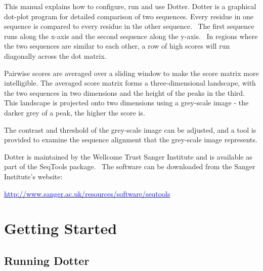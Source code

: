 \documentclass[letterpaper]{article}
\newcommand\textstyleInternetlink[1]{\textcolor{blue}{#1}}
\begin{document}
\setcounter{tocdepth}{10}
\renewcommand\contentsname{Contents}

\clearpage
\tableofcontents

{This manual explains how to configure, run and
use Dotter. Dotter is a graphical
dot-plot program for detailed comparison of two sequences.
Every residue in one sequence is compared to every residue
in the other sequence. \ The first sequence runs along the x-axis and
the second sequence along the y-axis. \ In regions where the two
sequences are similar to each other, a row of high scores will run
diagonally across the dot matrix.}

\bigskip

{Pairwise scores are averaged over a sliding window to make the
score matrix more intelligible. The averaged score matrix
forms a three-dimensional landscape, with the two sequences in two
dimensions and the height of the peaks in the third. This landscape is
projected onto two dimensions using a grey-scale image - the darker
grey of a peak, the higher the score is.}

\bigskip

{The contrast and threshold of the grey-scale image can be adjusted, and
a tool is provided to examine the sequence alignment that the
grey-scale image represents.}

\bigskip

Dotter is maintained by the Wellcome Trust
Sanger Institute and is available as part of the SeqTools package.
\ The software can be downloaded from the Sanger
Institute{\textquoteright}s website:

\href{http://www.sanger.ac.uk/resources/software/seqtools/}
{\textstyleInternetlink{http://www.sanger.ac.uk/resources/software/seqtools}}

{\color[rgb]{0.0,0.27058825,0.5254902}\section[Getting Started]{Getting Started}}
{\color[rgb]{0.30980393,0.5058824,0.7411765}\subsection[Running Dotter]{Running Dotter}}
\end{document}
